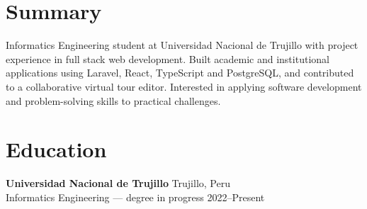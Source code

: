 


\section{Summary}
Informatics Engineering student at Universidad Nacional de Trujillo with project experience in full stack web development. Built academic and institutional applications using Laravel, React, TypeScript and PostgreSQL, and contributed to a collaborative virtual tour editor. Interested in applying software development and problem-solving skills to practical challenges.

\section{Education}
\textbf{Universidad Nacional de Trujillo} \hfill Trujillo, Peru\\
Informatics Engineering --- degree in progress \hfill 2022--Present

